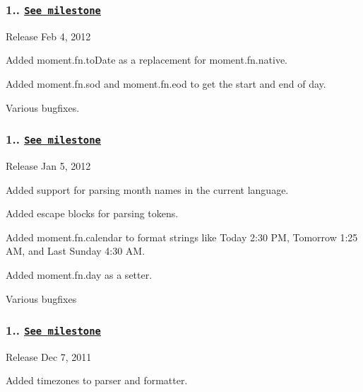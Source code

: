 \subsubsection*{1.. \href{https://github.com/timrwood/moment/issues?milestone=8&state=closed}{\tt See milestone}}


\begin{DoxyItemize}
\item Release Feb 4, 2012
\end{DoxyItemize}

Added {\ttfamily moment.\+fn.\+to\+Date} as a replacement for {\ttfamily moment.\+fn.\+native}.

Added {\ttfamily moment.\+fn.\+sod} and {\ttfamily moment.\+fn.\+eod} to get the start and end of day.

Various bugfixes.

\subsubsection*{1.. \href{https://github.com/timrwood/moment/issues?milestone=7&state=closed}{\tt See milestone}}


\begin{DoxyItemize}
\item Release Jan 5, 2012
\end{DoxyItemize}

Added support for parsing month names in the current language.

Added escape blocks for parsing tokens.

Added {\ttfamily moment.\+fn.\+calendar} to format strings like \textquotesingle{}Today 2\+:30 PM\textquotesingle{}, \textquotesingle{}Tomorrow 1\+:25 AM\textquotesingle{}, and \textquotesingle{}Last Sunday 4\+:30 AM\textquotesingle{}.

Added {\ttfamily moment.\+fn.\+day} as a setter.

Various bugfixes

\subsubsection*{1.. \href{https://github.com/timrwood/moment/issues?milestone=4&state=closed}{\tt See milestone}}


\begin{DoxyItemize}
\item Release Dec 7, 2011
\end{DoxyItemize}

Added timezones to parser and formatter.

